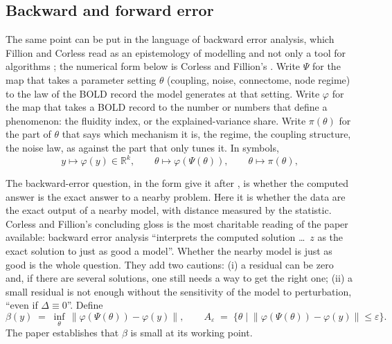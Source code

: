 \documentclass[11pt]{article}
\begin{document}
\subsection{Backward and forward error}\label{sec:bea}
The same point can be put in the language of backward error analysis, which Fillion and Corless read as an epistemology of modelling and not only a tool for algorithms \parencite{fillion2014}; the numerical form below is Corless and Fillion's \parencite{corless2016}. Write $\Psi$ for the map that takes a parameter setting $\theta$ (coupling, noise, connectome, node regime) to the law of the BOLD record the model generates at that setting. Write $\varphi$ for the map that takes a BOLD record to the number or numbers that define a phenomenon: the fluidity index, or the explained-variance share. Write $\pi(\theta)$ for the part of $\theta$ that says which mechanism it is, the regime, the coupling structure, the noise law, as against the part that only tunes it. In symbols,
\begin{equation}
y \mapsto \varphi(y)\in\mathbb{R}^{k}, \qquad \theta \mapsto \varphi(\Psi(\theta)), \qquad \theta \mapsto \pi(\theta),
\label{eq:objects}
\end{equation}

The backward-error question, in the form \textcite{corless2016} give it after \textcite{wilkinson1963}, is whether the computed answer is the exact answer to a nearby problem. Here it is whether the data are the exact output of a nearby model, with distance measured by the statistic. Corless and Fillion's concluding gloss is the most charitable reading of the paper available: backward error analysis ``interprets the computed solution \ldots\ $z$ as the exact solution to just as good a model''. Whether the nearby model is just as good is the whole question. They add two cautions: (i) a residual can be zero and, if there are several solutions, one still needs a way to get the right one; (ii) a small residual is not enough without the sensitivity of the model to perturbation, ``even if $\Delta\equiv 0$''. Define
\begin{equation}
\beta(y)\;=\;\inf_{\theta}\,\bigl\|\varphi(\Psi(\theta))-\varphi(y)\bigr\|,
\qquad
A_{\varepsilon}\;=\;\bigl\{\theta \;\big|\; \|\varphi(\Psi(\theta))-\varphi(y)\|\le\varepsilon\bigr\}.
\label{eq:beta}
\end{equation}
The paper establishes that $\beta$ is small at its working point.
\end{document}
